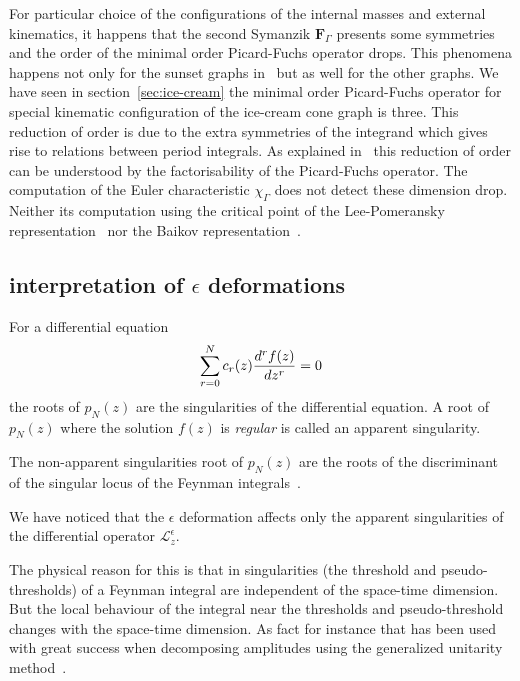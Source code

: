 \documentclass[a4paper,12pt]{article}
\numberwithin{equation}{section}
\numberwithin{figure}{section}
\begin{document}
For particular choice of the configurations of the internal masses and
external kinematics, it happens that the second Symanzik
$\textbf{F}_\Gamma$ presents some symmetries and the order of the
minimal order Picard-Fuchs operator drops.  This phenomena happens not
only for  the sunset graphs
in~\cite{Bloch:2014qca,Lairez:2022zkj,Bonisch:2021yfw,Bonisch:2020qmm,Pogel:2022vat}
but as well for the other graphs. We have seen in section~\ref{sec:ice-cream} the minimal order Picard-Fuchs
operator for special kinematic configuration of the ice-cream cone
graph is three.
This reduction of order is due to the extra symmetries of the
integrand which gives rise to relations between period integrals.
As explained in~\cite{Lairez:2022zkj} this reduction of order can be
understood by the factorisability of the Picard-Fuchs operator.  The
computation of the Euler characteristic $\chi_\Gamma$ does not detect
these dimension drop. Neither its computation using the critical point
of the
Lee-Pomeransky representation~\cite{Lee:2013hzt}   nor the
Baikov representation~\cite{Frellesvig:2017aai,Frellesvig:2019uqt,Cacciatori:2021nli}.

\subsection{interpretation of $\epsilon$ deformations}


For a differential equation
\begin{equation}
  \sum_{r=0}^N c_r(z) {d^rf(z)\over dz^r}=0  
\end{equation}
the roots of $p_N(z)$ are the singularities of the differential
equation. A root of $p_N(z)$ where the solution $f(z)$ is
\emph{regular} is called an apparent singularity.

The non-apparent singularities root of $p_N(z)$ are the roots of the
discriminant of the singular locus of the Feynman integrals~\cite{Doran:2023yzu}.

We have noticed that the $\epsilon$ deformation affects only the
apparent singularities of the differential operator $\mathscr{L}_z^\epsilon$.

The physical reason for this is that in singularities (the threshold
and pseudo-thresholds) of a Feynman integral are independent of the
space-time dimension.  But the local behaviour of the integral near
the thresholds and pseudo-threshold changes with the space-time
dimension.   As fact for instance that has been used with great success
when decomposing amplitudes using the generalized unitarity method~\cite{Bern:2011qt}.
\end{document}
